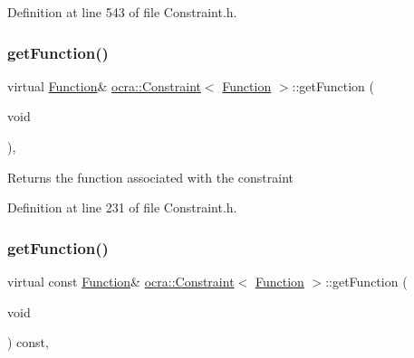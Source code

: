 Definition at line 543 of file Constraint.\+h.

\hypertarget{classocra_1_1Constraint_3_01Function_01_4_a81f1d8de34c0a123bc77d4798619fe9b}{}\label{classocra_1_1Constraint_3_01Function_01_4_a81f1d8de34c0a123bc77d4798619fe9b} 
\subsubsection{\texorpdfstring{get\+Function()}{getFunction()}\hspace{0.1cm}{\footnotesize\ttfamily [1/2]}}
{\footnotesize\ttfamily virtual \hyperlink{classocra_1_1Function}{Function}\& \hyperlink{classocra_1_1Constraint}{ocra\+::\+Constraint}$<$ \hyperlink{classocra_1_1Function}{Function} $>$\+::get\+Function (\begin{DoxyParamCaption}\item[{void}]{ }\end{DoxyParamCaption})\hspace{0.3cm}{\ttfamily [inline]}, {\ttfamily [virtual]}}

Returns the function associated with the constraint 

Definition at line 231 of file Constraint.\+h.

\hypertarget{classocra_1_1Constraint_3_01Function_01_4_ad7f2ac6dfb90ed0231cc3e73ef592581}{}\label{classocra_1_1Constraint_3_01Function_01_4_ad7f2ac6dfb90ed0231cc3e73ef592581} 
\subsubsection{\texorpdfstring{get\+Function()}{getFunction()}\hspace{0.1cm}{\footnotesize\ttfamily [2/2]}}
{\footnotesize\ttfamily virtual const \hyperlink{classocra_1_1Function}{Function}\& \hyperlink{classocra_1_1Constraint}{ocra\+::\+Constraint}$<$ \hyperlink{classocra_1_1Function}{Function} $>$\+::get\+Function (\begin{DoxyParamCaption}\item[{void}]{ }\end{DoxyParamCaption}) const\hspace{0.3cm}{\ttfamily [inline]}, {\ttfamily [virtual]}}



